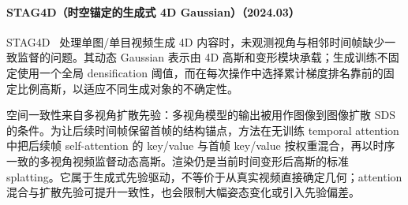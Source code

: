 \paragraph{STAG4D（时空锚定的生成式 4D Gaussian）（2024.03）}
STAG4D~\cite{2403_14939} 处理单图/单目视频生成 4D 内容时，未观测视角与相邻时间帧缺少一致监督的问题。其动态 Gaussian 表示由 4D 高斯和变形模块承载；生成训练不固定使用一个全局 densification 阈值，而在每次操作中选择累计梯度排名靠前的固定比例高斯，以适应不同生成对象的不确定性。

空间一致性来自多视角扩散先验：多视角模型的输出被用作图像到图像扩散 SDS 的条件。为让后续时间帧保留首帧的结构锚点，方法在无训练 temporal attention 中把后续帧 self-attention 的 key/value 与首帧 key/value 按权重混合，再以时序一致的多视角视频监督动态高斯。渲染仍是当前时间变形后高斯的标准 splatting。它属于生成式先验驱动，不等价于从真实视频直接确定几何；attention 混合与扩散先验可提升一致性，也会限制大幅姿态变化或引入先验偏差。

